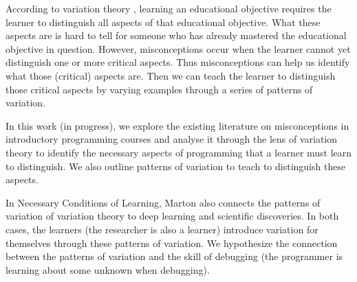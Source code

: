 According to variation theory \autocite[See][]{NCOL}, learning an educational
objective requires the learner to
distinguish all aspects of that educational objective. What these aspects are 
is hard to tell for someone who has already mastered the educational objective 
in question. However, misconceptions occur when the learner cannot yet 
distinguish one or more critical aspects. Thus misconceptions can help us 
identify what those (critical) aspects are. Then we can teach the learner to 
distinguish those critical aspects by varying examples through a series of 
patterns of variation.

In this work (in progress), we explore the existing literature on 
misconceptions in introductory programming courses and analyse it 
through the lens of variation theory to identify the necessary aspects of 
programming that a learner must learn to distinguish. We also outline patterns 
of variation to teach to distinguish these aspects.

In Necessary Conditions of Learning, Marton also connects the patterns of 
variation of variation theory to deep learning and scientific discoveries. In 
both cases, the learners (the researcher is also a learner) introduce variation 
for themselves through these patterns of variation. We hypothesize the 
connection between the patterns of variation and the skill of debugging (the 
programmer is learning about some unknown when debugging).
